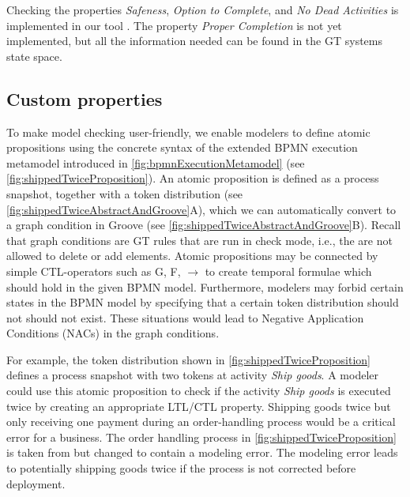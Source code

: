 \documentclass{lmcs} %
\begin{document}
Checking the properties \textit{Safeness}, \textit{Option to Complete}, and \textit{No Dead Activities} is implemented in our tool \cite{timkrauterLMCS2024Artifacts2023}.
The property \textit{Proper Completion} is not yet implemented, but all the information needed can be found in the GT systems state space.

\subsection{Custom properties} \label{subsec:customProperties}


To make model checking user-friendly, we enable modelers to define atomic propositions using the concrete syntax of the extended BPMN execution metamodel introduced in \autoref{fig:bpmnExecutionMetamodel} (see \autoref{fig:shippedTwiceProposition}).
An atomic proposition is defined as a process snapshot, together with a token distribution (see \autoref{fig:shippedTwiceAbstractAndGroove}A), which we can automatically convert to a graph condition in Groove (see \autoref{fig:shippedTwiceAbstractAndGroove}B).
Recall that graph conditions are GT rules that are run in check mode, i.e., the are not allowed to delete or add elements.
Atomic propositions may be connected by simple CTL-operators such as \textsf{G, F, $\to$} to create temporal formulae which should hold in the given BPMN model. 
Furthermore, modelers may forbid certain states in the BPMN model by specifying that a certain token distribution should not should not exist.
These situations would lead to Negative Application Conditions (NACs) in the graph conditions. 


For example, the token distribution shown in \autoref{fig:shippedTwiceProposition} defines a process snapshot with two tokens at activity \textit{Ship goods}.
A modeler could use this atomic proposition to check if the activity \textit{Ship goods} is executed twice by creating an appropriate LTL/CTL property.
Shipping goods twice but only receiving one payment during an order-handling process would be a critical error for a business.
The order handling process in \autoref{fig:shippedTwiceProposition} is taken from \cite{ruckerPracticalProcessAutomation2021} but changed to contain a modeling error.
The modeling error leads to potentially shipping goods twice if the process is not corrected before deployment.
\end{document}
